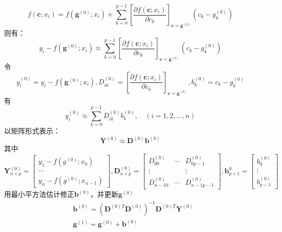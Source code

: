 \documentclass[master]{thesis-uestc}
\begin{document}
\begin{equation*}
    f(\mathbf{c};x_i)=f(\mathbf{g}^{(0)};x_i) + \sum_{k=0}^{p-1}\left[\frac{\partial f(\mathbf{c};x_i)}{\partial c_k}\right]_{\mathbf{c}=\mathbf{g}^{(0)}}\left(c_k-g_k^{(0)}\right)
\end{equation*}
则有：
\begin{equation*}
    y_i - f(\mathbf{g}^{(0)};x_i) \approx \sum_{k=0}^{p-1}\left[\frac{\partial f(\mathbf{c};x_i)}{\partial c_k}\right]_{\mathbf{c}=\mathbf{g}^{(0)}}\left(c_k-g_k^{(0)}\right)
\end{equation*}
令
\begin{equation*}
    y_i^{(0)}=y_i- f(\mathbf{g}^{(0)};x_i), D_{i k}^{(0)}=\left[\frac{\partial f(\mathbf{c};x_i)}{\partial c_k}\right]_{\mathbf{c}=\mathbf{g}^{(0)}}, b_k^{(0)}=c_k-g_k^{(0)}
\end{equation*}
有
\begin{equation*}
    y_i^{(0)} \approx \sum_{k=0}^{p-1} D_{i k}^{(0)} b_k^{(0)}, \quad(i=1,2, \ldots, n)
\end{equation*}
以矩阵形式表示：
\begin{equation*}
    \mathbf{Y}^{(0)} \approx \mathbf{D}^{(0)} \mathbf{b}^{(0)}
\end{equation*}
其中
\begin{equation*}
    \mathbf{Y}_{n \times p}^{(0)}=\left[\begin{array}{c}
        y_1-f\left(g^{(0)};x_0\right) \\
        \cdots \\
        y_n-f\left(g^{(0)};x_{n-1}\right)
        \end{array}\right], \mathbf{D}_{n \times p}^{(0)}=\left[\begin{array}{ccc}
        D_{00}^{(0)} & \cdots & D_{0 p-1}^{(0)} \\
        \vdots & & \vdots \\
        D_{n-1 0}^{(0)} & \cdots & D_{n-1 p-1}^{(0)}
        \end{array}\right], \mathbf{b}_{p \times 1}^0=\left[\begin{array}{c}
        b_0^{(0)} \\
        \vdots \\
        b_{p-1}^{(0)}
        \end{array}\right]
\end{equation*}
用最小平方法估计修正$\mathbf{b}^{(0)}$，并更新$\mathbf{g}^{(0)}$
\begin{equation*}
    \begin{aligned}
        &\mathbf{b}^{(0)}=\left(\mathbf{D}^{(0) T} \mathbf{D}^{(0)}\right)^{-1} \mathbf{D}^{(0) T} \mathbf{Y}^{(0)} \\
        &\mathbf{g}^{(1)} =\mathbf{g}^{(0)}+\mathbf{b}^{(0)}
    \end{aligned}
\end{equation*}
\end{document}
